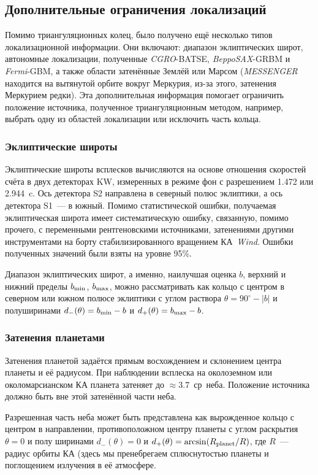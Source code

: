 \FloatBarrier
\subsection{Дополнительные ограничения локализаций}
Помимо триангуляционных колец, было получено ещё несколько типов локализационной информации. 
Они включают: диапазон эклиптических широт, автономные локализации, полученные 
\textit{CGRO}-BATSE, \textit{BeppoSAX}-GRBM и \textit{Fermi}-GBM, а также области 
затенённые Землёй или Марсом (\textit{MESSENGER} находится на вытянутой орбите вокруг Меркурия, из-за этого, 
затенения Меркурием редки). Эта дополнительная информация помогает ограничить 
положение источника, полученное триангуляционным методом, например, 
выбрать одну из областей локализации или исключить часть кольца.

\subsubsection{Эклиптические широты}
Эклиптические широты всплесков вычисляются на основе отношения скоростей счёта
в двух детекторах KW, измеренных в режиме фон с разрешением 1.472 или 2.944~c. Ось
детектора S2 направлена в северный полюс эклиптики, а ось детектора S1~--- в южный.
Помимо статистической ошибки, получаемая эклиптическая широта имеет систематическую 
ошибку, связанную, помимо прочего, с переменными рентгеновскими источниками,
затенениями другими инструментами на борту стабилизированного вращением КА~\textit{Wind}.
Ошибки полученных значений были взяты на уровне 95\%.

Диапазон эклиптических широт, а именно, наилучшая оценка $b$, верхний и нижний
пределы $b_{{\mathrm{min}}}$, $b_{{\mathrm{max}}}$, можно рассматривать как кольцо с центром в северном или южном
полюсе эклиптики с углом раствора $\theta = 90^\circ - |b|$ и полуширинами 
$d_{-}(\theta) = b_{{\mathrm{min}}} - b$ и $d_{+}(\theta) = b_{{\mathrm{max}}} - b$.

\subsubsection{Затенения планетами}
Затенения планетой задаётся прямым восхождением и склонением центра планеты и её
радиусом. При наблюдении всплеска на околоземном или околомарсианском КА планета
затеняет до $\approx 3.7$~ср~неба. Положение источника должно быть вне этой 
затенённой части неба.

Разрешенная часть неба может быть представлена как вырожденное кольцо с центром
в направлении, противоположном центру планеты с углом раскрытия $\theta =0$ и 
полу ширинами $d_{-}(\theta) = 0$ и $d_{+}(\theta)= \arcsin(R_{{\mathrm{planet}}}/R)$, 
где $R$~--- радиус орбиты КА (здесь мы пренебрегаем сплюснутостью планеты 
и поглощением излучения в её атмосфере.

